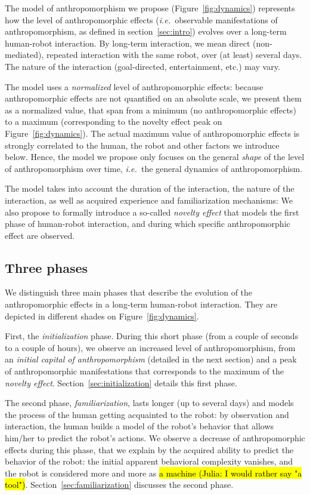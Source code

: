 \documentclass[lettersize, apacite, twoside, HRI]{apa_HRI}
\newcommand{\ie}{{\textit{i.e.~}}}
\begin{document}
The model of anthropomorphism we propose (Figure~\ref{fig:dynamics}) represents
how the level of anthropomorphic effects (\ie observable manifestations of
anthropomorphism, as defined in section~\ref{sec:intro}) evolves over a
long-term human-robot interaction. By long-term interaction, we mean direct
(non-mediated), repeated interaction with the same robot, over (at least) several
days. The nature of the interaction (goal-directed, entertainment, etc.) may vary.

The model uses a \emph{normalized} level of anthropomorphic effects: because
anthropomorphic effects are not quantified on an absolute scale, we present
them as a normalized value, that span from a minimum (no anthropomorphic
effects) to a maximum (corresponding to the novelty effect peak on
Figure~\ref{fig:dynamics}). The actual maximum value of anthropomorphic effects
is strongly correlated to the human, the robot and other factors we introduce
below. Hence, the model we propose only focuses on the general \emph{shape} of
the level of anthropomorphism over time, \ie the general dynamics of
anthropomorphism.

The model takes into account the duration of the interaction, the nature of the
interaction, as well as acquired experience and familiarization mechanisms: We
also propose to formally introduce a so-called \emph{novelty effect} that
models the first phase of human-robot interaction, and during which specific
anthropomorphic effect are observed.

\subsection{Three phases}
\label{sec:phases}

We distinguish three main phases that describe the evolution of the
anthropomorphic effects in a long-term human-robot interaction. They are
depicted in different shades on Figure~\ref{fig:dynamics}.

First, the \emph{initialization} phase. During this short phase (from a couple
of seconds to a couple of hours), we observe an increased level of
anthropomorphism, from an \emph{initial capital of anthropomorphism}
(detailed in the next section) and a peak of anthropomorphic manifestations
that corresponds to the maximum of the \emph{novelty effect}.
Section~\ref{sec:initialization} details this first phase.

The second phase, \emph{familiarization}, lasts longer (up to several days) and
models the process of the human getting acquainted to the robot: by observation
and interaction, the human builds a model of the robot's behavior that allows
him/her to predict the robot's actions. We observe a decrease of
anthropomorphic effects during this phase, that we explain by the acquired
ability to predict the behavior of the robot: the initial apparent behavioral
complexity vanishes, and the robot is considered more and more as \hl{a machine (Julia: I would rather say "a tool")}.
Section~\ref{sec:familiarization} discusses the second phase.
\end{document}

